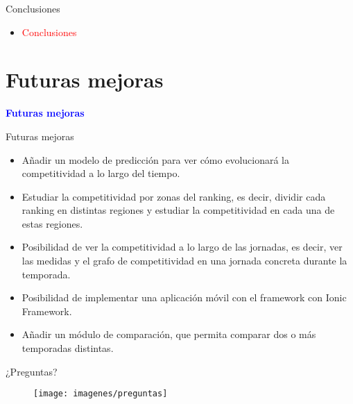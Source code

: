 \documentclass[10pt,hyperref={unicode}]{beamer}
\begin{document}
		\begin{frame}{Conclusiones}
				\begin{itemize}
					\item \textcolor{red}{Conclusiones}
					
				\end{itemize}
			\end{frame}
			
	
	\section{Futuras mejoras}
	
	\begin{frame}
		\begin{center}
			\Huge\textbf{\textsf{\textcolor{blue}{Futuras mejoras}}}
		\end{center}
	\end{frame}	
	
	
	\begin{frame}{Futuras mejoras}
		\begin{itemize}
			\item Añadir un modelo de predicción para ver cómo evolucionará la competitividad a lo largo del tiempo.
			
			\item Estudiar la competitividad por zonas del ranking, es decir, dividir cada ranking en distintas regiones y estudiar la competitividad en cada una de estas regiones. 
			
			\item Posibilidad de ver la competitividad a lo largo de las jornadas, es decir, ver las medidas y el grafo de competitividad en una jornada concreta durante la temporada.
			
			\item Posibilidad de implementar una aplicación móvil con el framework con Ionic Framework.
			
			\item Añadir un módulo de comparación, que permita comparar dos o más temporadas distintas.
			
		\end{itemize}
	\end{frame}
	
	
	\begin{frame}{¿Preguntas?}
		\begin{figure}
			\centering
			\texttt{[image: imagenes/preguntas]}
		\end{figure}

	\end{frame}
	
	
\end{document}
